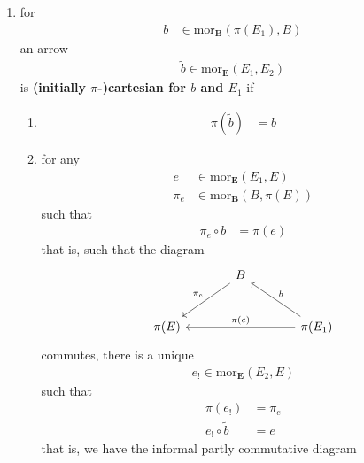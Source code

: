 \begin{enumerate}
\begin{enumerate}
\begin{align*}
  \right)
\end{align*}
such that
\begin{align*}
  E_{1}
  &=
  \mathrm{dom}_{\mathbf{E}}
  \left(
    \gamma_{\pi}(b_{12},E_{2})
  \right)
\end{align*}
the equation
\begin{align*}
  \gamma_{\pi}(b_{12},E_{2})
  \circ
  \gamma_{\pi}(b_{1},E_{1})
  &=
  \gamma_{\pi}(b_{12} \circ b_{1},E_{2})
\end{align*}
holds
\end{enumerate}
\item[(1I)]
for
\begin{align*}
  b
  &\in
  \mathrm{mor}_{\mathbf{B}}
  \left(
    \pi(E_{1}),
    B
  \right)
\end{align*}
an arrow
\begin{align*}
  \widetilde{b}
  \in
  \mathrm{mor}_{\mathbf{E}}(E_{1},E_{2})
\end{align*}
is \textbf{(initially $\pi$-)cartesian for $b$ and $E_{1}$} if
\begin{enumerate}
\item[(IC1)]
\begin{align*}
  \pi(\widetilde{b})
  &=
  b
\end{align*}
\item[(IC2)]
for any
\begin{align*}
  e
  &\in
  \mathrm{mor}_{\mathbf{E}}(E_{1},E)
  \\
  \pi_{e}
  &\in
  \mathrm{mor}_{\mathbf{B}}
  \left(
    B,
    \pi(E)
  \right)
\end{align*}
such that
\begin{align*}
  \pi_{e}
  \circ
  b
  &=
  \pi(e)
\end{align*}
that is, such that the diagram
\[
\begin{tikzcd}[sep=large]
  &
  B
  \arrow[swap]{dl}{\pi_{e}}
  &
  \\
  \pi(E)
  &
  &
  \pi(E_{1})
  \arrow[swap]{ll}{\pi(e)}
  \arrow[swap]{ul}{b}
\end{tikzcd}
\]
commutes, there is a unique
\begin{align*}
  e_{!}
  \in
  \mathrm{mor}_{\mathbf{E}}(E_{2},E)
\end{align*}
such that
\begin{align*}
  \pi(e_{!})
  &=
  \pi_{e}
  \\
  e_{!}
  \circ
  \tilde{b}
  &=
  e
\end{align*}
that is, we have the informal partly commutative diagram
\[
\begin{tikzcd}[sep=large]

\end{tikzcd}\]
\end{enumerate}
\end{enumerate}
